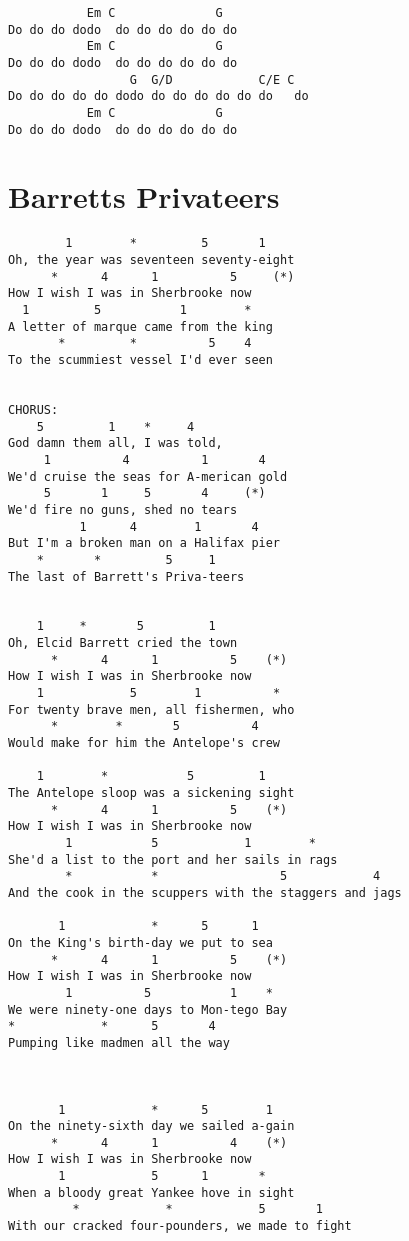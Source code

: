 \documentclass[leqno]{memoir}
\begin{document}
\begin{verbatim}
           Em C              G
Do do do dodo  do do do do do do
           Em C              G
Do do do dodo  do do do do do do 
                 G  G/D            C/E C
Do do do do do dodo do do do do do do   do 
           Em C              G
Do do do dodo  do do do do do do
\end{verbatim}
\newpage

\chapter{Barretts Privateers}
\begin{verbatim}
        1        *         5       1
Oh, the year was seventeen seventy-eight
      *      4      1          5     (*)
How I wish I was in Sherbrooke now
  1         5           1        *
A letter of marque came from the king
       *         *          5    4
To the scummiest vessel I'd ever seen


CHORUS:
    5         1    *     4
God damn them all, I was told,
     1          4          1       4
We'd cruise the seas for A-merican gold
     5       1     5       4     (*)
We'd fire no guns, shed no tears
          1      4        1       4
But I'm a broken man on a Halifax pier
    *       *         5     1
The last of Barrett's Priva-teers


    1     *       5         1
Oh, Elcid Barrett cried the town
      *      4      1          5    (*)
How I wish I was in Sherbrooke now
    1            5        1          *
For twenty brave men, all fishermen, who
      *        *       5          4
Would make for him the Antelope's crew

    1        *           5         1
The Antelope sloop was a sickening sight
      *      4      1          5    (*)
How I wish I was in Sherbrooke now
        1           5            1        *
She'd a list to the port and her sails in rags
        *           *                 5            4
And the cook in the scuppers with the staggers and jags

       1            *      5      1
On the King's birth-day we put to sea
      *      4      1          5    (*)
How I wish I was in Sherbrooke now
        1          5           1    *
We were ninety-one days to Mon-tego Bay
*            *      5       4
Pumping like madmen all the way



       1            *      5        1
On the ninety-sixth day we sailed a-gain
      *      4      1          4    (*)
How I wish I was in Sherbrooke now
       1            5      1       *
When a bloody great Yankee hove in sight
         *            *            5       1
With our cracked four-pounders, we made to fight



\end{verbatim}
\end{document}
